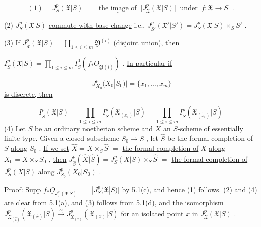 \begin{equation*}
(1)\quad \big|J^{p}_{S}(\mathfrak{X}|S)\big| \;=\; \underline{\text{the image of}} \;\; \big|J^{p}_{\mathfrak{X}}(\mathfrak{X}|S)\big| \;\; \underline{\text{under}} \;\; f : \mathfrak{X} \to S \;\;.
\end{equation*}


(2)  $J^p_S(\mathfrak{X}|S)$  \underline{commute with base change}  i.e.,  $J^p_{S'}(\mathfrak{X}'|S') = J^p_S(\mathfrak{X}|S) \times_S S'$  .

(3)  If  $J^p_{\mathfrak{X}}(\mathfrak{X}|S) = \coprod_{1\leq i\leq m} \mathfrak{Y}^{(i)}$  \underline{(disjoint union), then}

$\underline{I}^p_S(\mathfrak{X}|S) = \prod_{1\leq i\leq m} \underline{I}^0_S(f_*\underline{O}_{\mathfrak{Y}(i)})$  . \underline{In particular if}

\begin{equation*}
|J^p_{X_0}(X_0|S_0)| = \{x_1,\ldots,x_m\}
\end{equation*}
\underline{is discrete, then}

\begin{equation*}
\underline{I}^p_S(\mathfrak{X}|S) = \prod_{1\leq i\leq m} \underline{I}^p_S(\mathfrak{X}_{(x_i)}|S) = \prod_{1\leq i\leq m} \underline{I}^p_S(\mathfrak{X}_{(\hat{x}_i)}|S)
\end{equation*}
(4)  \underline{Let}  $S$  \underline{be an ordinary noetherian scheme and}  $X$  \underline{an} $S$-\underline{scheme of essentially finite type. Given a closed subscheme}  $S_0 \to S$  , \underline{let}  $\hat{S}$  \underline{be the formal completion of}  $S$  \underline{along}  $S_0$  . \underline{If we set}  $\hat{X} = X \times_S \hat{S}$ $=$ \underline{the formal completion of}  $X$  \underline{along}  $X_0 = X \times_S S_0$  , \underline{then}  $J^p_{\hat{S}}(\hat{X}|\hat{S}) = J^p_S(X|S) \times_S \hat{S}$ $=$ \underline{the formal completion of}  $J^p_S(X|S)$  \underline{along}  $J^p_{S_0}(X_0|S_0)$  .

\underline{Proof}:  Supp $f_*\underline{O}_{J^p_{\mathfrak{X}}(\mathfrak{X}|S)}$ $=$ $|J^p_S(\mathfrak{X}|S)|$  by 5.1(c), and hence (1) follows. (2) and (4) are clear from 5.1(a), and (3) follows from 5.1(d), and the isomorphism $J^p_{\mathfrak{X}_{(\hat{x})}}(\mathfrak{X}_{(\hat{x})}|S) \xrightarrow{\sim} J^p_{\mathfrak{X}_{(x)}}(\mathfrak{X}_{(x)}|S)$  for an isolated point  $x$  in  $J^p_{\mathfrak{X}}(\mathfrak{X}|S)$  .

